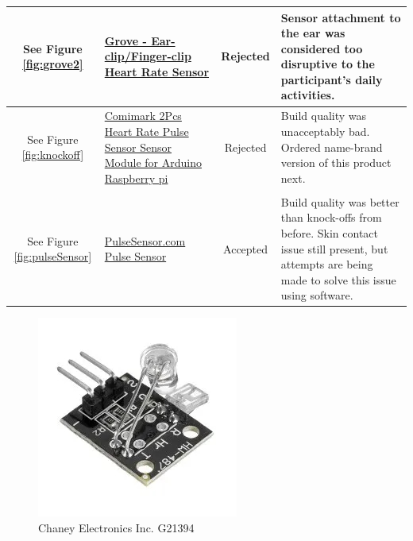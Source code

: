 \documentclass[12pt, titlepage]{article}
\begin{document}
\begin{table}[H]
\begin{tabular}{ | c | m{3cm} | c | m{7cm} |}
    \hline
    See Figure \ref{fig:grove2}      & \href{https://www.seeedstudio.com/Grove-Ear-clip-Heart-Rate-Sensor.html?queryID=ad9334e40c7058a87ffd810044eecd1c                                                  & objectID=2143   & indexName=bazaar_retailer_products}{Grove - Ear-clip/Finger-clip Heart Rate Sensor}                                                                       & Rejected & Sensor attachment to the ear was considered too disruptive to the participant's daily activities. \\
    \hline
    See Figure \ref{fig:knockoff}     & \href{https://www.amazon.ca/Comimark-Sensor-Module-Arduino-Raspberry/dp/B07V6VV8CM}{Comimark 2Pcs Heart Rate Pulse Sensor Sensor Module for Arduino Raspberry pi} & Rejected        & Build quality was unacceptably bad. Ordered name-brand version of this product next.                                                                                                                                                                                     \\                                                                                              \\
    \hline
    See Figure \ref{fig:pulseSensor} & \href{https://pulsesensor.com/}{PulseSensor.com Pulse Sensor}                                                                                                     & Accepted        & Build quality was better than knock-offs from before. Skin contact issue still present, but attempts are being made to solve this issue using software.                                                                                                                  \\
    \hline
  \end{tabular}
\end{table}

\begin{figure}[H]
\centering
  \includegraphics[scale=1]{G21394}
  \caption{Chaney Electronics Inc. G21394}
  \label{fig:G21394}
\end{figure}
\end{document}
